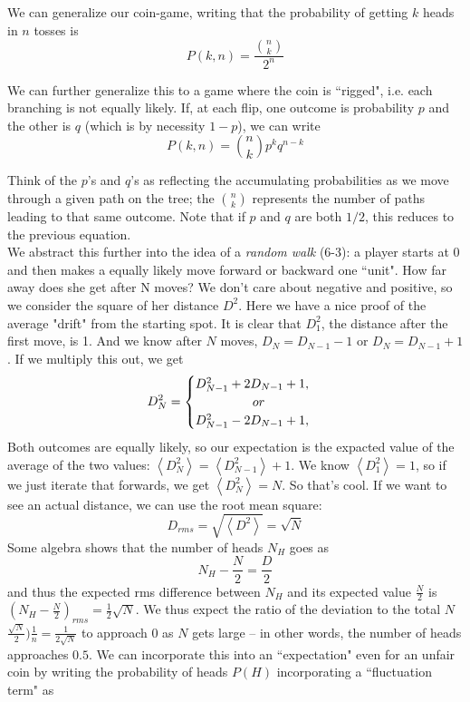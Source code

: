 \documentclass[10pt,letterpaper]{article}
\begin{document}
We can generalize our coin-game, writing that the probability of getting $k$ heads in $n$ tosses is 
$$ P(k, n) = \frac{{{n}\choose{k}}}{2^n}$$

We can further generalize this to a game where the coin is ``rigged", i.e. each branching is not equally likely. If, at each flip, one outcome is probability $p$ and the other is $q$ (which is by necessity $1-p$), we can write 
$$ P(k, n) =  {{n}\choose{k}}p^k q^{n-k}$$

Think of the $p$'s and $q$'s as reflecting the accumulating probabilities as we move through a given path on the tree; the ${{n}\choose{k}}$ represents the number of paths leading to that same outcome. Note that if $p$ and $q$ are both $1/2$, this reduces to the previous equation. \\

\indent We abstract this further into the idea of a \textit{random walk} (6-3): a player starts at 0 and then makes a equally likely move forward or backward one ``unit". How far away does she get after N moves? We don't care about negative and positive, so we consider the square of her distance $D^2$. Here we have a nice proof of the average "drift" from the starting spot. It is clear that $D_1^2$, the distance after the first move, is 1. And we know after $N$ moves, $D_N = D_{N-1} -1$ or $D_N = D_{N-1}+1$. If we multiply this out, we get 
\begin{equation}
    D_N^2=
    \begin{cases}
      D^2_{N-1} + 2D_{N-1} +1 , \\
     \indent \indent \indent or \\
      D^2_{N-1} - 2D_{N-1} + 1, 
    \end{cases}
  \end{equation}
Both outcomes are equally likely, so our expectation is the expacted value of the average of the two values: $\left<D^2_N\right> = \left<D^2_{N-1}\right> + 1$. We know $\left<D_1^2\right> = 1$, so if we just iterate that forwards, we get $\left<D^2_N\right> = N$. So that's cool. If we want to see an actual distance, we can use the root mean square: 
$$ D_{rms} = \sqrt{\left<D^2\right>} = \sqrt{N}
$$
Some algebra shows that the number of heads $N_H$ goes as
$$ N_H - \frac{N}{2} = \frac{D}{2}$$
and thus the expected rms difference between $N_H$ and its expected value $\frac{N}{2}$ is $\left(N_H - \frac{N}{2}\right)_{rms} = \frac{1}{2}\sqrt{N}$.
We thus expect the ratio of the deviation to the total $N$ $\frac{\sqrt{N}}{2})\frac{1}{n} = \frac{1}{2\sqrt{N}}$ to approach 0 as $N$ gets large -- in other words, the number of heads approaches $0.5$. We can incorporate this into an ``expectation" even for an unfair coin by writing the probability of heads $P(H)$ incorporating a ``fluctuation term" as
\end{document}
